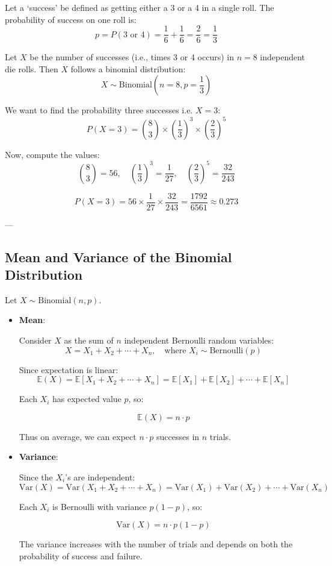 \documentclass[twoside]{book}
\begin{document}
Let a `success' be defined as getting either a 3 or a 4 in a single roll. The probability of success on one roll is:
\[
p = P(3 \text{ or } 4) = \frac{1}{6} + \frac{1}{6} = \frac{2}{6} = \frac{1}{3}
\]

Let $X$ be the number of successes (i.e., times 3 or 4 occurs) in $n = 8$ independent die rolls. Then $X$ follows a binomial distribution:
\[
X \sim \text{Binomial}\left(n =8, p = \frac{1}{3}\right)
\]

We want to find the probability three successes i.e. $X = 3$:
\[
P(X = 3) = \binom{8}{3} \times \left( \frac{1}{3} \right)^3 \times \left( \frac{2}{3} \right)^5
\]

Now, compute the values:
\[
\binom{8}{3} = 56, \quad \left( \frac{1}{3} \right)^3 = \frac{1}{27}, \quad \left( \frac{2}{3} \right)^5 = \frac{32}{243}
\]

\[
P(X = 3) = 56 \times \frac{1}{27} \times \frac{32}{243} = \frac{1792}{6561} \approx 0.273
\]

---

\subsection{Mean and Variance of the Binomial Distribution}

Let $X \sim \text{Binomial}(n, p)$.

\begin{itemize}
    \item \textbf{Mean}:

    Consider $X$ as the sum of $n$ independent Bernoulli random variables:
    \[
    X = X_1 + X_2 + \cdots + X_n, \quad \text{where } X_i \sim \text{Bernoulli}(p)
    \]

    Since expectation is linear:
    \[
    \mathbb{E}(X) = \mathbb{E}[X_1 + X_2 + \cdots + X_n] = \mathbb{E}[X_1] + \mathbb{E}[X_2] + \cdots + \mathbb{E}[X_n]
    \]

    Each $X_i$ has expected value $p$, so:
    \begin{textbox}
        \[
    \mathbb{E}(X) = n \cdot p
    \]
    \end{textbox}

    Thus on average, we can expect $n \cdot p$ successes in $n$ trials.

    \item \textbf{Variance}:

    Since the $X_i$'s are independent:
    \[
    \text{Var}(X) = \text{Var}(X_1 + X_2 + \cdots + X_n) = \text{Var}(X_1) + \text{Var}(X_2) + \cdots + \text{Var}(X_n)
    \]

    Each $X_i$ is Bernoulli with variance $p(1 - p)$, so:
    \begin{textbox}
        \[
    \text{Var}(X) = n \cdot p(1 - p)
    \]
    \end{textbox}

    The variance increases with the number of trials and depends on both the probability of success and failure.
\end{itemize}
\end{document}
